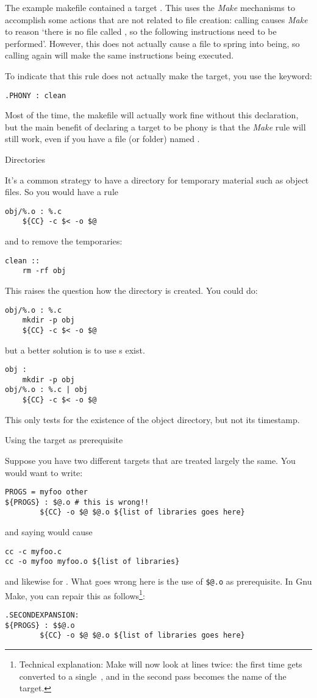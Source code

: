 The example makefile contained a target . This uses
the \emph{Make} mechanisms to accomplish some actions that are not
related to file creation: calling  causes \emph{Make} to
reason `there is no file called , so the following
instructions need to be performed'. However, this does not actually
cause a file  to spring into being, so calling 
again will make the same instructions being executed.

To indicate that this rule does not actually make the target, you use
the  keyword:
\begin{lstlisting}
.PHONY : clean
\end{lstlisting}
Most of the time, the makefile will actually work fine without this
declaration, but the main benefit of declaring a target to be phony is
that the \emph{Make} rule will still work, even if you have a file (or folder)
named .

 {Directories}

It's a common strategy to have a directory for temporary material
such as object files. So you would have a rule
\begin{lstlisting}
obj/%.o : %.c
    ${CC} -c $< -o $@
\end{lstlisting}
and to remove the temporaries:
\begin{lstlisting}
clean ::
    rm -rf obj
\end{lstlisting}
This raises the question how the  directory is created.
You could do:
\begin{lstlisting}
obj/%.o : %.c
    mkdir -p obj
    ${CC} -c $< -o $@
\end{lstlisting}
but a better solution is to use
s exist.
\begin{lstlisting}
obj :
    mkdir -p obj
obj/%.o : %.c | obj
    ${CC} -c $< -o $@
\end{lstlisting}
This only tests for the existence of the object directory,
but not its timestamp.

 {Using the target as prerequisite}

Suppose you have two different targets that are treated largely the
same. You would want to write:
\begin{lstlisting}
PROGS = myfoo other
${PROGS} : $@.o # this is wrong!!
        ${CC} -o $@ $@.o ${list of libraries goes here}
\end{lstlisting}
and saying  would cause 
\begin{lstlisting}
cc -c myfoo.c
cc -o myfoo myfoo.o ${list of libraries}
\end{lstlisting}
and likewise for . What goes wrong here is the use of
\verb+$@.o+ as prerequisite. In Gnu Make, you can repair this as
follows\footnote{Technical explanation: Make will now look at lines
  twice: the first time \n{\$\$} gets converted to a single~\n{\$},
  and in the second pass  becomes the name of the target.}:
\begin{lstlisting}
.SECONDEXPANSION:
${PROGS} : $$@.o
        ${CC} -o $@ $@.o ${list of libraries goes here}
\end{lstlisting}

